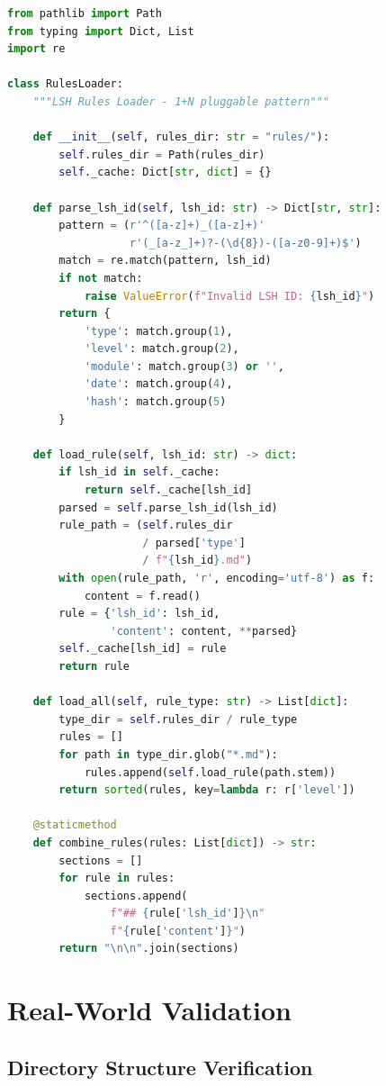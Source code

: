\documentclass{article}
\begin{document}
\begin{lstlisting}[language=Python, caption={RulesLoader implementation}]
from pathlib import Path
from typing import Dict, List
import re

class RulesLoader:
    """LSH Rules Loader - 1+N pluggable pattern"""

    def __init__(self, rules_dir: str = "rules/"):
        self.rules_dir = Path(rules_dir)
        self._cache: Dict[str, dict] = {}

    def parse_lsh_id(self, lsh_id: str) -> Dict[str, str]:
        pattern = (r'^([a-z]+)_([a-z]+)'
                   r'(_[a-z_]+)?-(\d{8})-([a-z0-9]+)$')
        match = re.match(pattern, lsh_id)
        if not match:
            raise ValueError(f"Invalid LSH ID: {lsh_id}")
        return {
            'type': match.group(1),
            'level': match.group(2),
            'module': match.group(3) or '',
            'date': match.group(4),
            'hash': match.group(5)
        }

    def load_rule(self, lsh_id: str) -> dict:
        if lsh_id in self._cache:
            return self._cache[lsh_id]
        parsed = self.parse_lsh_id(lsh_id)
        rule_path = (self.rules_dir
                     / parsed['type']
                     / f"{lsh_id}.md")
        with open(rule_path, 'r', encoding='utf-8') as f:
            content = f.read()
        rule = {'lsh_id': lsh_id,
                'content': content, **parsed}
        self._cache[lsh_id] = rule
        return rule

    def load_all(self, rule_type: str) -> List[dict]:
        type_dir = self.rules_dir / rule_type
        rules = []
        for path in type_dir.glob("*.md"):
            rules.append(self.load_rule(path.stem))
        return sorted(rules, key=lambda r: r['level'])

    @staticmethod
    def combine_rules(rules: List[dict]) -> str:
        sections = []
        for rule in rules:
            sections.append(
                f"## {rule['lsh_id']}\n"
                f"{rule['content']}")
        return "\n\n".join(sections)
\end{lstlisting}

\section{Real-World Validation}

\subsection{Directory Structure Verification}
\end{document}
